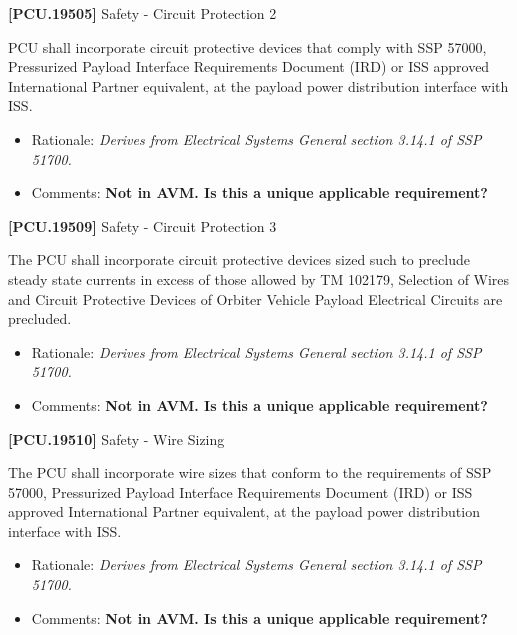 \documentclass[12pt,oneside,oldfontcommands]{memoir}
\begin{document}
\textbf{[PCU.19505]} Safety - Circuit Protection 2

\gls{PCU} shall incorporate circuit protective devices that comply with SSP 57000, Pressurized Payload Interface Requirements Document (IRD) or \gls{ISS} approved International Partner equivalent, at the payload power distribution interface with \gls{ISS}.

\begin{itemize}
\item{} Rationale: \emph{Derives from Electrical Systems General section 3.14.1 of SSP 51700.}

\item{} Comments: \textbf{Not in AVM. Is this a unique applicable requirement?}

\end{itemize}

\textbf{[PCU.19509]} Safety - Circuit Protection 3

The \gls{PCU} shall incorporate circuit protective devices sized such to preclude steady state currents in excess of those allowed by TM 102179, Selection of Wires and Circuit Protective Devices of Orbiter Vehicle Payload Electrical Circuits are precluded.

\begin{itemize}
\item{} Rationale: \emph{Derives from Electrical Systems General section 3.14.1 of SSP 51700.}

\item{} Comments: \textbf{Not in AVM. Is this a unique applicable requirement?}

\end{itemize}

\textbf{[PCU.19510]} Safety - Wire Sizing

The \gls{PCU} shall incorporate wire sizes that conform to the requirements of SSP 57000, Pressurized Payload Interface Requirements Document (IRD) or \gls{ISS} approved International Partner equivalent, at the payload power distribution interface with \gls{ISS}.

\begin{itemize}
\item{} Rationale: \emph{Derives from Electrical Systems General section 3.14.1 of SSP 51700.}

\item{} Comments: \textbf{Not in AVM. Is this a unique applicable requirement?}

\end{itemize}
\end{document}
